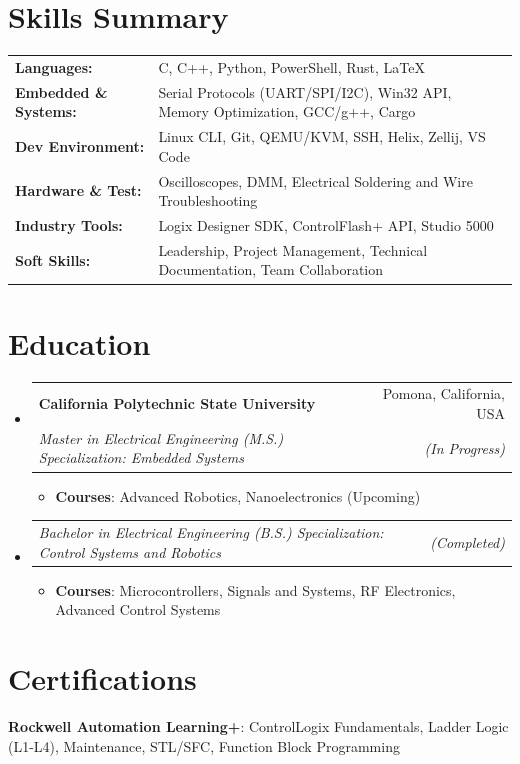 \documentclass[a4paper,20pt]{article}
\makeatletter
\newcommand{\resumeItem}[2]{
  \item\small{
    \textbf{#1}{: #2 \vspace{-2pt}}
  }
}
\newcommand{\resumeSubheading}[4]{
  \vspace{-1pt}\item[]
    \begin{tabular*}{0.97\textwidth}{l@{\extracolsep{\fill}}r}
      \textbf{#1} & #2 \\
      \textit{#3} & \textit{#4} \\
    \end{tabular*}\vspace{-5pt}
}
\newcommand{\resumeRoleSubheading}[2]{
  \vspace{-1pt}\item[]
    \begin{tabular*}{0.97\textwidth}{l@{\extracolsep{\fill}}r}
      \textit{#1} & \textit{#2} \\
    \end{tabular*}\vspace{-5pt}
}
\newcommand{\resumeSubHeadingListStart}{\begin{itemize}[leftmargin=*]}
\newcommand{\resumeSubHeadingListEnd}{\end{itemize}}
\newcommand{\resumeItemListStart}{\begin{itemize}}
\newcommand{\resumeItemListEnd}{\end{itemize}\vspace{-4pt}}
\makeatother
\begin{document}
\vspace{0pt}
\section{Skills Summary}
\begin{tabular*}{\textwidth}{l@{\extracolsep{\fill}}l}
  \textbf{Languages:} & C, C++, Python, PowerShell, Rust, LaTeX \\[2pt]
  \textbf{Embedded \& Systems:} & Serial Protocols (UART/SPI/I2C), Win32 API, Memory Optimization, GCC/g++, Cargo \\[2pt]
  \textbf{Dev Environment:} & Linux CLI, Git, QEMU/KVM, SSH, Helix, Zellij, VS Code \\[2pt]
  \textbf{Hardware \& Test:} & Oscilloscopes, DMM, Electrical Soldering and Wire Troubleshooting \\[2pt]
  \textbf{Industry Tools:} & Logix Designer SDK, ControlFlash+ API, Studio 5000 \\[2pt]
  \textbf{Soft Skills:} & Leadership, Project Management, Technical Documentation, Team Collaboration \\ 
\end{tabular*}

\vspace{0pt}
\section{Education}
  \resumeSubHeadingListStart
    \resumeSubheading
      {California Polytechnic State University}{Pomona, California, USA}
      {Master in Electrical Engineering (M.S.)  Specialization: Embedded Systems}{(In Progress)}
    \vspace{-8pt}
    \resumeItemListStart
      \resumeItem{Courses}{Advanced Robotics, Nanoelectronics (Upcoming)}
    \resumeItemListEnd
    \vspace{-2pt}
    \resumeRoleSubheading
      {Bachelor in Electrical Engineering (B.S.)  Specialization: Control Systems and Robotics}{(Completed)}
    \resumeItemListStart
      \resumeItem{Courses}{Microcontrollers, Signals and Systems, RF Electronics, Advanced Control Systems}
    \resumeItemListEnd
    \resumeSubHeadingListEnd
    \vspace{-8pt}


\vspace{-2pt}
\section{Certifications}
\textbf{Rockwell Automation Learning+}: ControlLogix Fundamentals, Ladder Logic (L1-L4), Maintenance, STL/SFC, Function Block Programming
\end{document}
